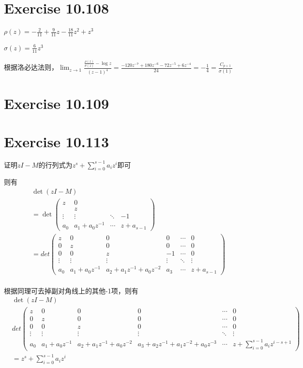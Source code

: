\documentclass[twoside,a4paper]{article}
\begin{document}
\section{Exercise 10.108}
$\rho(z)=-\frac{2}{11}+\frac{9}{11}z-\frac{18}{11}z^2+z^3$

$\sigma(z)=\frac{6}{11}z^3$

根据洛必达法则，$\lim_{z\rightarrow 1}\frac{\frac{\rho(z)}{\sigma(z)}-\log z}{(z-1)^4}=\frac{-120z^{-7}+180z^{-6}-72z^{-5}+6z^{-4}}{24}=-\frac{1}{4}=\frac{C_{p+1}}{\sigma(1)}$


\section{Exercise 10.109}

\section{Exercise 10.113}
  证明$zI-M$的行列式为$z^s+\sum_{i=0}^{s-1}a_iz^i$即可

  则有
    $$\begin{aligned}
        &\det(zI-M)\\
          &= \det\begin{pmatrix}
           z & 0 &  & \\
            & z &  & \\
           \vdots & \vdots & \ddots & -1 \\
           a_0 & a_1+a_0z^{-1} & \cdots & z+a_{s-1}
          \end{pmatrix}\\
        &=det\begin{pmatrix}
           z & 0 & 0 & 0 &\cdots& 0\\
            0 & z & 0 &0 &\cdots & 0\\
            0 & 0 & z & -1 &\cdots & 0\\
           \vdots & \vdots &\vdots &\vdots & \ddots & \vdots \\
           a_0 & a_1+a_0z^{-1}& a_2 + a_1z^{-1}+a_0z^{-2} & a_3&\cdots & z+a_{s-1}
          \end{pmatrix}\\
        \end{aligned}$$
      
        根据同理可去掉副对角线上的其他-1项，则有
        $$\begin{aligned}
          &\det(zI-M)\\
        &det\begin{pmatrix}
            z & 0 & 0 & 0 &\cdots& 0\\
            0 & z & 0 &0 &\cdots & 0\\
            0 & 0 & z & 0 &\cdots & 0\\
           \vdots & \vdots &\vdots &\vdots & \ddots & \vdots \\
           a_0 & a_1+a_0z^{-1}& a_2 + a_1z^{-1}+a_0z^{-2} & a_3+a_2z^{-1} + a_1z^{-2}+a_0z^{-3}&\cdots & z+\sum_{i = 0}^{s-1}a_iz^{i-s+1}
        \end{pmatrix}\\
        &=z^s+\sum_{i=0}^{s-1}a_iz^i
      \end{aligned}$$
\end{document}
